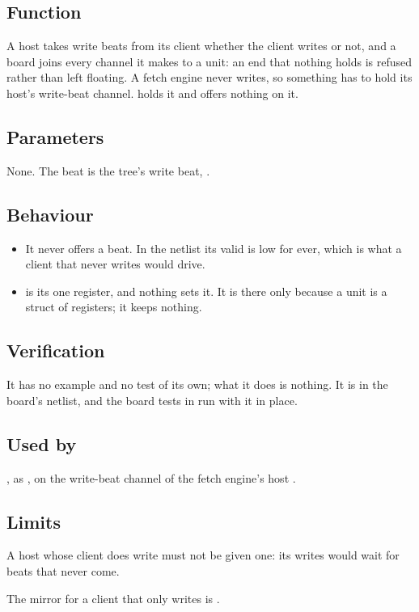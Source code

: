 
%
{}

\subsection*{Function}

A host takes write beats from its client whether the client writes or
not, and a board joins every channel it makes to a unit: an end that
nothing holds is refused rather than left floating. A fetch engine
never writes, so something has to hold its host's write-beat channel.
 holds it and offers nothing on it.

\subsection*{Parameters}

None. The beat is the tree's write beat, .


\subsection*{Behaviour}

\begin{itemize}
\item It never offers a beat. In the netlist its valid is low for
ever, which is what a client that never writes would drive.
\item {} is its one register, and nothing sets it. It is
there only because a unit is a struct of registers; it keeps nothing.
\end{itemize}

\subsection*{Verification}

It has no example and no test of its own; what it does is nothing. It
is in the board's netlist, and the board tests in
 run with it in place.

\subsection*{Used by}

, as , on the write-beat channel of the
fetch engine's host .

\subsection*{Limits}

A host whose client does write must not be given one: its writes would
wait for beats that never come.

The mirror for a client that only writes is .
